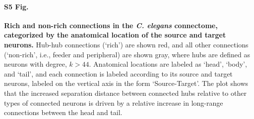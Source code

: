 \documentclass[10pt,letterpaper]{article}
\begin{document}

\paragraph*{S5 Fig.}
\label{S5_Fig}
{\bf Rich and non-rich connections in the \emph{C. elegans} connectome, categorized by the  anatomical location of the source and target neurons.}
   Hub-hub connections (`rich') are shown red, and all other connections (`non-rich', i.e., feeder and peripheral) are shown gray, where hubs are defined as neurons with degree, $k > 44$.
Anatomical locations are labeled as `head', `body', and `tail', and each connection is labeled according to its source and target neurons, labeled on the vertical axis in the form `Source-Target'.
The plot shows that the increased separation distance between connected hubs relative to other types of connected neurons is driven by a relative increase in long-range connections between the head and tail.

\end{document}
